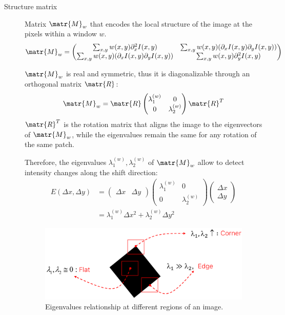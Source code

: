 \begin{description}
    \item[Structure matrix] 
        Matrix $\matr{M}_w$ that encodes the local structure of the image at the pixels within a window $w$.
        \[ \matr{M}_w = \begin{pmatrix} 
            \sum_{x, y} w(x, y) \partial_x^2 I(x, y)                        & \sum_{x, y} w(x, y) (\partial_x I(x, y) \partial_y I(x, y)) \\
            \sum_{x, y} w(x, y) (\partial_x I(x, y) \partial_y I(x, y))     & \sum_{x, y} w(x, y) \partial_y^2 I(x, y)
        \end{pmatrix} \]

        $\matr{M}_w$ is real and symmetric, thus it is diagonalizable through an orthogonal matrix $\matr{R}$:
        \[ \matr{M}_w = \matr{R} \begin{pmatrix} \lambda_1^{(w)} & 0 \\ 0 & \lambda_2^{(w)} \end{pmatrix} \matr{R}^T \]
        $\matr{R}^T$ is the rotation matrix that aligns the image to the eigenvectors of $\matr{M}_w$, 
        while the eigenvalues remain the same for any rotation of the same patch.

        Therefore, the eigenvalues $\lambda_1^{(w)}, \lambda_2^{(w)}$ of $\matr{M}_w$ allow to detect intensity changes along the shift direction:
        \[
            \begin{split}
                E(\Delta x, \Delta y) &= \begin{pmatrix} \Delta x & \Delta y \end{pmatrix} 
                    \begin{pmatrix} \lambda_1^{(w)} & 0 \\ 0 & \lambda_2^{(w)} \end{pmatrix}
                    \begin{pmatrix} \Delta x \\ \Delta y \end{pmatrix} \\
                &= \lambda_1^{(w)} \Delta x^2 + \lambda_2^{(w)} \Delta y^2
            \end{split}
        \]

        \begin{figure}[H]
            \centering
            \includegraphics[width=0.6\linewidth]{./img/_harris_rotation.pdf}
            \caption{Eigenvalues relationship at different regions of an image.}
        \end{figure}
\end{description}



